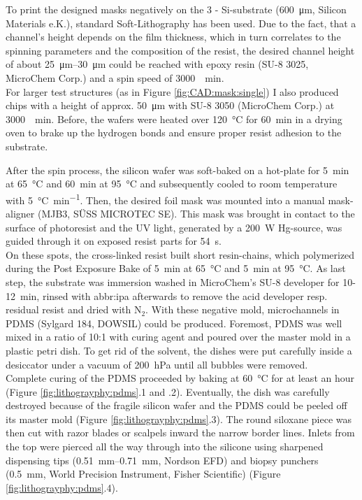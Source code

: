 To print the designed masks negatively on the \SI{3}{\inch} - Si-substrate (\SI{600}{\micro\meter}, Silicon Materials e.K.), standard Soft-Lithography has been used. Due to the fact, that a channel's height depends on the film thickness, which in turn correlates to the spinning parameters and the composition of the resist, the desired channel height of about \SIrange{25}{30}{\micro\meter} could be reached with epoxy resin (SU-8 3025, MicroChem Corp.) and a spin speed of \SI{3000}{\per\minute}.\\
For larger test structures (as in Figure \ref{fig:CAD:mask:single}) I also produced chips with a height of approx. \SI{50}{\micro\meter} with SU-8 3050 (MicroChem Corp.) at \SI{3000}{\per\minute}. Before, the wafers were heated over \SI{120}{\degreeCelsius} for \SI{60}{\minute} in a drying oven to brake up the hydrogen bonds and ensure proper resist adhesion to the substrate.

After the spin process, the silicon wafer was soft-baked on a hot-plate for \SI{5}{\minute} at \SI{65}{\degreeCelsius} and \SI{60}{\minute} at \SI{95}{\degreeCelsius} and subsequently cooled to room temperature with \SI{5}{\degreeCelsius\per\minute}. Then, the desired foil mask was mounted into a manual mask-aligner (MJB3, SÜSS MICROTEC SE).
This mask was brought in contact to the surface of photoresist and the UV light, generated by a \SI{200}{\watt} Hg-source, was guided through it on exposed resist parts for \SI{54}{\second}.\\
On these spots, the cross-linked resist built short resin-chains, which polymerized during the Post Exposure Bake of \SI{5}{\minute} at \SI{65}{\degreeCelsius} and \SI{5}{\minute} at \SI{95}{\degreeCelsius}. As last step, the substrate was immersion washed in MicroChem's SU-8 developer for 10-\SI{12}{\minute}, rinsed with \acrfull{abbr:ipa} afterwards to remove the acid developer resp. residual resist and dried with N$_2$.
\newpage
With these negative mold, microchannels in PDMS (Sylgard 184, DOWSIL) could be produced. Foremost, PDMS was well mixed in a ratio of 10:1 with curing agent and poured over the master mold in a plastic petri dish. To get rid of the solvent, the dishes were put carefully inside a desiccator under a vacuum of \SI{200}{\hecto\pascal} until all bubbles were removed. \\
Complete curing of the PDMS proceeded by baking at \SI{60}{\degreeCelsius} for at least an hour (Figure \ref{fig:lithograyphy:pdms}.1 and .2). Eventually, the dish was carefully destroyed because of the fragile silicon wafer and the PDMS could be peeled off its master mold (Figure \ref{fig:lithograyphy:pdms}.3). The round siloxane piece was then cut with razor blades or scalpels inward the narrow border lines. Inlets from the top were pierced all the way through into the silicone using sharpened dispensing tips (\SIrange{0.51}{0.71}{\mm}, Nordson EFD) and biopsy punchers (\SI{0.5}{\mm}, World Precision Instrument, Fisher Scientific) (Figure \ref{fig:lithograyphy:pdms}.4).

